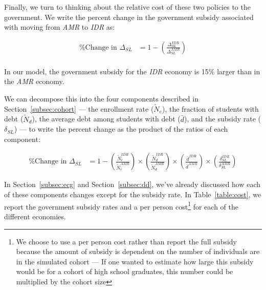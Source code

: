   Finally, we turn to thinking about the relative cost of these two policies to the government. We
  write the percent change in the government subsidy associated with moving from \textit{AMR}
  to \textit{IDR} as:

  \begin{align*}
    \text{\% Change in } \Delta_{SL} &= 1 - \left( \frac{\Delta^{IDR}_{SL}}{\Delta^{AMR}_{SL}} \right) \\
  \end{align*}

  In our model, the government subsidy for the \textit{IDR} economy is 15\% larger than in the
  \textit{AMR} economy.

  We can decompose this into the four components described in Section~\ref{subsec:cohort} --- the
  enrollment rate ($\tilde{N}_e$), the fraction of students with debt ($\tilde{N}_d$), the average
  debt among students with debt ($\bar{d}$), and the subsidy rate ($\delta_{SL}$) --- to write the
  percent change as the product of the ratios of each component:

  \begin{align*}
    \text{\% Change in } \Delta_{SL} &= 1 -
      \left( \frac{\tilde{N}^{IDR}_e}{\tilde{N}^{AMR}_e} \right) \times
      \left( \frac{\tilde{N}^{IDR}_d}{\tilde{N}^{AMR}_d} \right) \times
      \left( \frac{\bar{d}^{IDR}}{\bar{d}^{AMR}} \right) \times
      \left( \frac{\delta^{IDR}_{SL}}{\delta^{AMR}_{SL}} \right)
  \end{align*}

  In Section~\ref{subsec:ecg} and Section~\ref{subsec:dd}, we've already discussed how each of these
  components changes except for the subsidy rate. In Table~\ref{table:cost}, we report the
  government subsidy rates and a per person cost\footnote{We choose to use a per person cost rather
  than report the full subsidy because the amount of subsidy is dependent on the number of
  individuals are in the simulated cohort --- If one wanted to estimate how large this subsidy would
  be for a cohort of high school graduates, this number could be multiplied by the cohort size} for
  each of the different economies.

